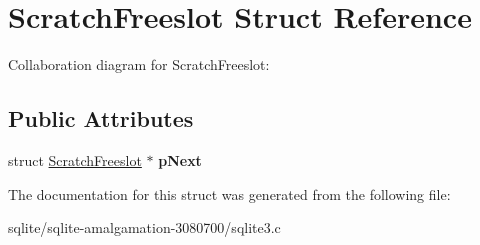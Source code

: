 \hypertarget{struct_scratch_freeslot}{\section{Scratch\+Freeslot Struct Reference}
\label{struct_scratch_freeslot}
}


Collaboration diagram for Scratch\+Freeslot\+:
\subsection*{Public Attributes}
\begin{DoxyCompactItemize}
\item 
\hypertarget{struct_scratch_freeslot_aca5c55a56a2a63a5be0756707a04bee8}{struct \hyperlink{struct_scratch_freeslot}{Scratch\+Freeslot} $\ast$ {\bfseries p\+Next}}\label{struct_scratch_freeslot_aca5c55a56a2a63a5be0756707a04bee8}

\end{DoxyCompactItemize}


The documentation for this struct was generated from the following file\+:\begin{DoxyCompactItemize}
\item 
sqlite/sqlite-\/amalgamation-\/3080700/sqlite3.\+c\end{DoxyCompactItemize}
